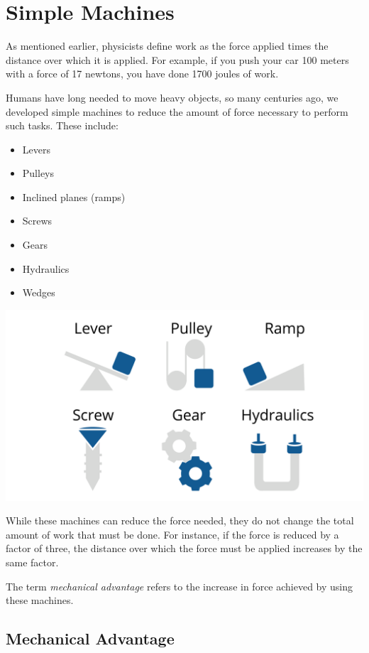 \chapter{Simple Machines}

As mentioned earlier, physicists define work as the force applied times the 
distance over which it is applied. For example, if you push your car 100 meters 
with a force of 17 newtons, you have done 1700 joules of work.

Humans have long needed to move heavy objects, so many centuries ago, we 
developed simple machines to reduce the amount of force necessary to perform 
such tasks. These include:

\begin{itemize}
    \item Levers
    \item Pulleys
    \item Inclined planes (ramps)
    \item Screws
    \item Gears
    \item Hydraulics
    \item Wedges
\end{itemize}

\includegraphics[width=\textwidth]{simplemachines.png}

While these machines can reduce the force needed, they do not change the total 
amount of work that must be done. For instance, if the force is reduced by a 
factor of three, the distance over which the force must be applied increases by 
the same factor.

The term \textit{mechanical advantage} refers to the increase in force achieved 
by using these machines.

\section{Mechanical Advantage}

